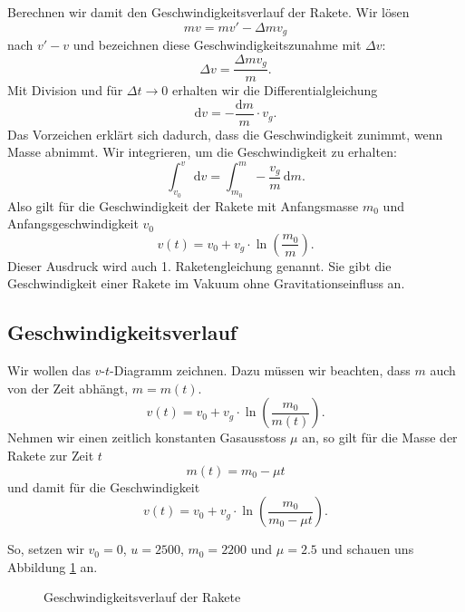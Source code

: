 \documentclass[%
11pt,%
twoside,%
titlepage,%
swissgerman,%
headsepline%
]{scrartcl}
\newcommand{\definition}[1]{\colorbox{emerald}{#1}}
\theoremstyle{definition}
\theoremstyle{plain}
\begin{document}
Berechnen wir damit den Geschwindigkeitsverlauf der Rakete. Wir lösen
$$mv=mv'-\Delta mv_g$$
nach $v'-v$ und bezeichnen diese Geschwindigkeitszunahme mit $\Delta v$:
$$\Delta v=\frac{\Delta mv_g}{m}.$$
Mit Division und für $\Delta t\to0$ erhalten wir die Differentialgleichung
$$\mathrm{d}v=-\frac{\mathrm{d}m}{m}\cdot v_g.$$
Das Vorzeichen erklärt sich dadurch, dass die Geschwindigkeit zunimmt, wenn Masse abnimmt. Wir integrieren, um die Geschwindigkeit zu erhalten:
$$\int_{v_0}^v\,\mathrm{d}v=\int_{m_0}^m-\frac{v_g}{m}\,\mathrm{d}m.$$
Also gilt für die Geschwindigkeit der Rakete mit Anfangsmasse $m_0$ und Anfangsgeschwindigkeit $v_0$
$$v(t)=v_0+v_g\cdot\ln\left(\frac{m_0}{m}\right).$$
Dieser Ausdruck wird auch \definition{1. Raketengleichung} genannt. Sie gibt die Geschwindigkeit einer Rakete im Vakuum ohne Gravitationseinfluss an.

\subsection{Geschwindigkeitsverlauf}

Wir wollen das $v$-$t$-Diagramm zeichnen. Dazu müssen wir beachten, dass $m$ auch von der Zeit abhängt, $m=m(t)$.
$$v(t)=v_0+v_g\cdot\ln\left(\frac{m_0}{m(t)}\right).$$
Nehmen wir einen zeitlich konstanten Gasausstoss $\mu$ an, so gilt für die Masse der Rakete zur Zeit $t$
$$m(t)=m_0-\mu t$$
und damit für die Geschwindigkeit
$$v(t)=v_0+v_g\cdot\ln\left(\frac{m_0}{m_0-\mu t}\right).$$

So, setzen wir $v_0=0$, $u=2500$, $m_0=2200$ und $\mu=2.5$ und schauen uns Abbildung \ref{geschwindigkeitrakete} an.

\begin{figure}
\begin{center}
\end{center}
\caption{Geschwindigkeitsverlauf der Rakete}\label{geschwindigkeitrakete}
\end{figure}
\end{document}
